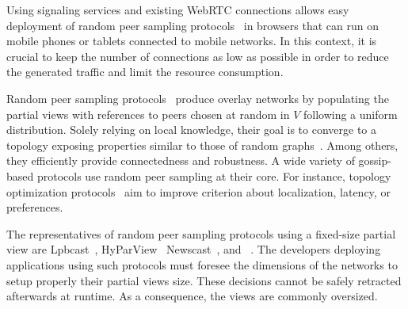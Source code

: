 
Using signaling services and existing WebRTC connections allows easy deployment
of random peer sampling protocols~\cite{jelasity2004peer} in browsers that can
run on mobile phones or tablets connected to mobile networks. In this context,
it is crucial to keep the number of connections as low as possible in order to
reduce the generated traffic and limit the resource consumption.

Random peer sampling protocols~\cite{jelasity2004peer, jelasity2007gossip}
produce overlay networks by populating the partial views with references to
peers chosen at random in $V$ following a uniform distribution. Solely relying
on local knowledge, their goal is to converge to a topology exposing properties
similar to those of random graphs~\cite{erdos1959random}. Among others, they
efficiently provide connectedness and robustness. A wide variety of gossip-based
protocols use random peer sampling at their core. For instance, topology
optimization protocols~\cite{voulgaris2005epidemic, jelasity2009tman} aim to
improve criterion about localization, latency, or preferences.

The representatives of random peer sampling protocols using a fixed-size partial
view are Lpbcast~\cite{eugster2003lightweight},
HyParView~\cite{leitao2007hyparview} Newscast~\cite{tolgyeski2009adaptive}, and
\CYCLON~\cite{voulgaris2005cyclon}. The developers deploying applications using
such protocols must foresee the dimensions of the networks to setup properly
their partial views size. These decisions cannot be safely retracted afterwards
at runtime. As a consequence, the views are commonly oversized.

